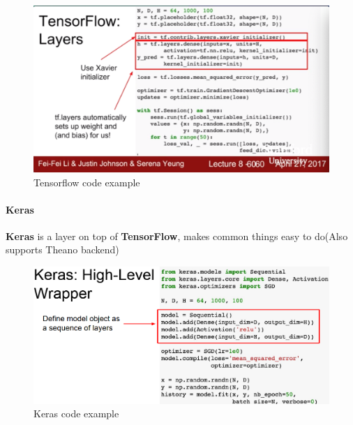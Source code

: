 \documentclass[11pt]{article}
\begin{document}
\begin{figure}[h]
\centering
\captionsetup{justification=centering}
\includegraphics[width=0.9\linewidth]{L712.pdf}
\caption{ Tensorflow code example}
\label{fig:L712}
\end{figure}
\paragraph{Keras}
\textbf{Keras } is a layer on top of \textbf{TensorFlow}, makes common things easy to do(Also supports Theano backend)
\begin{figure}[h]
\centering
\captionsetup{justification=centering}
\includegraphics[width=0.9\linewidth]{L713.pdf}
\caption{ Keras code example}
\label{fig:L713}
\end{figure}
\clearpage
\end{document}
